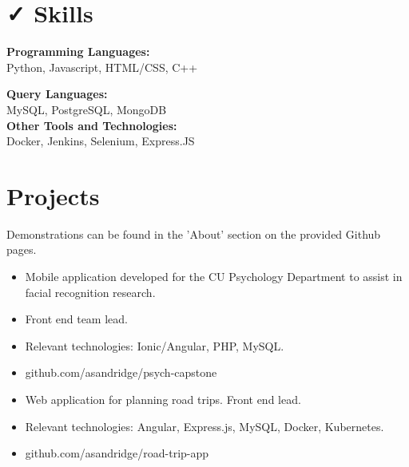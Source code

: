 \documentclass{resume}
\begin{document}
\section{{\faCheck} Skills}
\textbf{Programming Languages:} \\
Python, Javascript, HTML/CSS, C++

\bigskip
\textbf{Query Languages:} \\
MySQL, PostgreSQL, MongoDB\\

\bigskip
\textbf{Other Tools and Technologies:} \\
Docker, Jenkins, Selenium, Express.JS\\

\section{{\faFolder} Projects}
Demonstrations can be found in the 'About' section on the provided Github pages. \\
\bigskip
{}
\begin{itemize}
  \item Mobile application developed for the CU Psychology Department to assist in facial recognition research.
  \item Front end team lead.
  \item Relevant technologies: Ionic/Angular, PHP, MySQL.
  \item github.com/asandridge/psych-capstone
\end{itemize}
\bigskip
{}
\begin{itemize}
  \item Web application for planning road trips. Front end lead.
  \item Relevant technologies: Angular, Express.js, MySQL, Docker, Kubernetes.
  \item github.com/asandridge/road-trip-app
\end{itemize}
\end{document}
